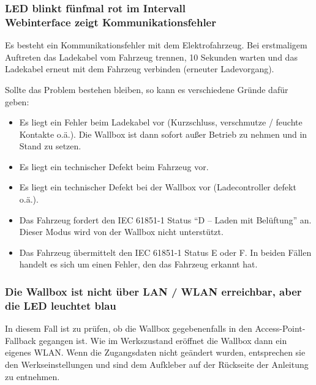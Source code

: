 \documentclass[a4paper,10pt]{article}
\begin{document}
\begin{multicols*}{2}
    \subsubsection*{LED blinkt fünfmal rot im Intervall \\ Webinterface zeigt Kommunikationsfehler}
    Es besteht ein Kommunikationsfehler mit dem Elektrofahrzeug. Bei erstmaligem
    Auftreten das Ladekabel vom Fahrzeug trennen, 10 Sekunden warten und das
    Ladekabel erneut mit dem Fahrzeug verbinden (erneuter Ladevorgang).

    Sollte das Problem bestehen bleiben, so kann es verschiedene Gründe dafür
    geben:
    \begin{itemize}
        \item Es liegt ein Fehler beim Ladekabel vor (Kurzschluss, verschmutze / feuchte
              Kontakte o.ä.). Die Wallbox ist dann sofort außer Betrieb zu nehmen und
              in Stand zu setzen.
        \item Es liegt ein technischer Defekt beim Fahrzeug vor.
        \item Es liegt ein technischer Defekt bei der Wallbox vor
			(Ladecontroller defekt o.ä.).
        \item Das Fahrzeug fordert den IEC 61851-1 Status \enquote{D – Laden mit Belüftung}
              an. Dieser Modus wird von der Wallbox nicht unterstützt.
        \item Das Fahrzeug übermittelt den IEC 61851-1 Status E oder F. In beiden Fällen
              handelt es sich um einen Fehler, den das Fahrzeug erkannt hat.
    \end{itemize}

    \subsubsection*{Die Wallbox ist nicht über LAN / WLAN erreichbar, aber die
	LED leuchtet blau}
    In diesem Fall ist zu prüfen, ob die Wallbox gegebenenfalls in den Access-Point-Fallback
    gegangen ist. Wie im Werkszustand eröffnet die Wallbox dann ein eigenes
    WLAN. Wenn die Zugangsdaten nicht geändert wurden, entsprechen sie den Werkseinstellungen und sind dem
    Aufkleber auf der Rückseite der Anleitung zu entnehmen.



\end{multicols*}
\end{document}
